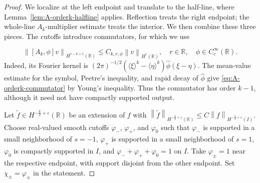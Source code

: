 \documentclass[11pt,reqno]{amsart}
\theoremstyle{plain}
\theoremstyle{definition}
\numberwithin{equation}{section}
\newcommand{\wh}[1]{\widehat{#1}}
\newcommand{\wt}[1]{\widetilde{#1}}
\newcommand{\norm}[1]{\left\lVert #1 \right\rVert}
\newcommand{\vph}{\varphi}
\newcommand{\R}{\mathbb{R}}
\begin{document}
\begin{proof}
We localize at the left endpoint and translate to the half-line, where
Lemma~\ref{lem:A-orderk-halfline} applies. Reflection treats the right
endpoint; the whole-line $A_k$-multiplier estimate treats the interior. We then
combine these three pieces.
The cutoffs introduce commutators, for which we use

\begin{equation}\label{eq:A-orderk-commutator}
    \norm{[A_k,\phi]v}_{H^{r-k+1}(\R)}
    \le C_{k,r,\phi}\norm{v}_{H^r(\R)},
    \quad r\in\R,\quad \phi\in C_c^\infty(\R).
\end{equation}
Indeed, its Fourier kernel is
$(2\pi)^{-1/2}(\langle\xi\rangle^k-\langle\eta\rangle^k)
\wh\phi(\xi-\eta)$. The mean-value estimate for the symbol, Peetre's
inequality, and rapid decay of $\wh\phi$ give
\eqref{eq:A-orderk-commutator} by Young's inequality. Thus the
commutator has order $k-1$, although it need not have compactly supported
output.

Let $\wt f\in H^{-\frac{k}{2}+\varepsilon}(\R)$ be an extension of $f$ with
$\norm{\wt f}_{H^{-\frac{k}{2}+\varepsilon}(\R)}
\le C\norm{f}_{H^{-\frac{k}{2}+\varepsilon}(I)}$. Choose real-valued smooth cutoffs
$\vph_-$, $\vph_+$, and $\vph_0$ such that $\vph_-$ is supported in a small
neighborhood of $s=-1$, $\vph_+$ is supported in a small neighborhood of
$s=1$, $\vph_0$ is compactly supported in $I$, and
$\vph_-+\vph_++\vph_0=1$ on $I$. Take $\vph_\pm=1$ near the respective
endpoint, with support disjoint from the other endpoint. Set
$\chi_\pm=\vph_\pm$ in the statement.


\end{proof}
\end{document}
